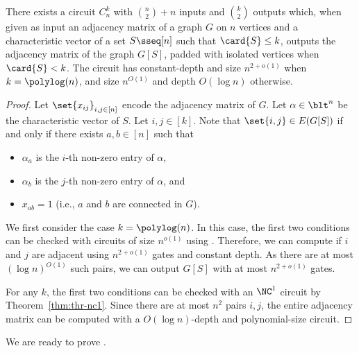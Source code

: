 \documentclass[11pt]{article}
\begin{document}
\begin{lemma}
    \label{lemma:induced_subgraph_circuit}
    There exists a circuit $C^k_n$ with $\binom{n}{2} + n$ inputs
    and $\binom{k}{2}$ outputs which,
    when given as input
    an adjacency matrix 
    of a graph $G$ on $n$ vertices
    and a characteristic vector of a set $S \sseq [n]$
    such that $\card{S} \leq k$,
    outputs the adjacency matrix of the graph $G[S]$,
    padded with isolated vertices when $\card{S} < k$.
    The circuit has constant-depth and size $n^{2+o(1)}$
    when $k = \polylog(n)$, and
    size $n^{O(1)}$ and depth $O(\log n)$ otherwise.
\end{lemma}
\begin{proof}
    Let $\set{x_{ij}}_{i,j \in [n]}$ encode the adjacency matrix of $G$.
    Let $\alpha \in \blt^n$ be the characteristic vector of $S$.
    Let $i,j \in [k]$.
    Note that $\set{i,j} \in E(G[S])$
    if and only if
    there exists
    $a,b \in [n]$
    such that
    \begin{itemize}
        \item 
            $\alpha_a$ is the $i$-th non-zero entry of $\alpha$,
        \item 
            $\alpha_b$ is the $j$-th non-zero entry of $\alpha$, and
        \item 
            $x_{ab} = 1$ (i.e., $a$ and $b$ are connected in $G$).
    \end{itemize}
    We first consider the case $k = \polylog(n)$.
    In this case,
    the first two conditions can be checked with 
    circuits of size
    $n^{o(1)}$
    using .
    Therefore, we can 
    compute 
    if $i$ and $j$ are adjacent
    using $n^{2+o(1)}$ gates and constant depth.
    As there are at most 
    $(\log n)^{O(1)}$ 
    such pairs,
    we can output $G[S]$
    with at most 
    $n^{2+o(1)}$ gates.

    For any $k$, the first two conditions can be checked with an $\NC^1$
    circuit by Theorem~\ref{thm:thr-nc1}.
    Since there are at most $n^2$ pairs $i,j$, the entire adjacency matrix
    can be computed with a $O(\log n)$-depth and polynomial-size circuit.
\end{proof}

We are ready to prove .
\end{document}
